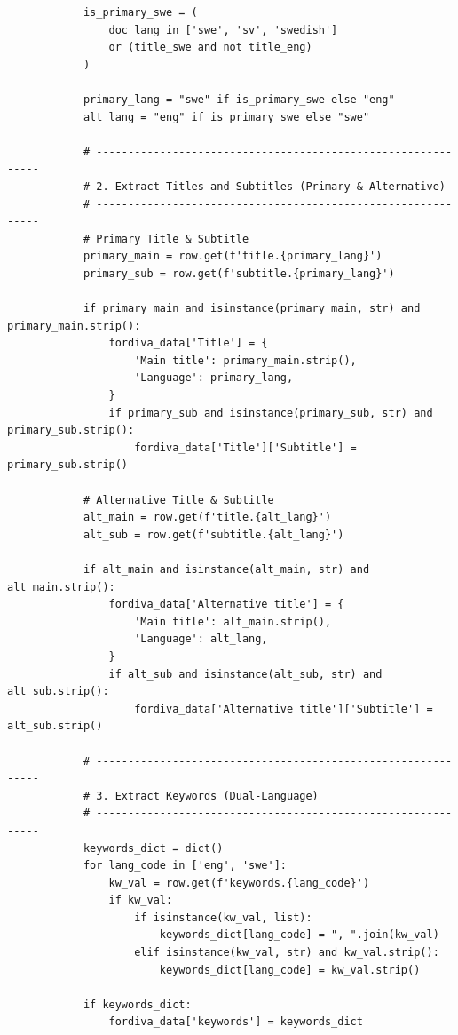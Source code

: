 \begin{lstlisting}
            is_primary_swe = (
                doc_lang in ['swe', 'sv', 'swedish']
                or (title_swe and not title_eng)
            )

            primary_lang = "swe" if is_primary_swe else "eng"
            alt_lang = "eng" if is_primary_swe else "swe"

            # -------------------------------------------------------------
            # 2. Extract Titles and Subtitles (Primary & Alternative)
            # -------------------------------------------------------------
            # Primary Title & Subtitle
            primary_main = row.get(f'title.{primary_lang}')
            primary_sub = row.get(f'subtitle.{primary_lang}')

            if primary_main and isinstance(primary_main, str) and primary_main.strip():
                fordiva_data['Title'] = {
                    'Main title': primary_main.strip(),
                    'Language': primary_lang,
                }
                if primary_sub and isinstance(primary_sub, str) and primary_sub.strip():
                    fordiva_data['Title']['Subtitle'] = primary_sub.strip()

            # Alternative Title & Subtitle
            alt_main = row.get(f'title.{alt_lang}')
            alt_sub = row.get(f'subtitle.{alt_lang}')

            if alt_main and isinstance(alt_main, str) and alt_main.strip():
                fordiva_data['Alternative title'] = {
                    'Main title': alt_main.strip(),
                    'Language': alt_lang,
                }
                if alt_sub and isinstance(alt_sub, str) and alt_sub.strip():
                    fordiva_data['Alternative title']['Subtitle'] = alt_sub.strip()

            # -------------------------------------------------------------
            # 3. Extract Keywords (Dual-Language)
            # -------------------------------------------------------------
            keywords_dict = dict()
            for lang_code in ['eng', 'swe']:
                kw_val = row.get(f'keywords.{lang_code}')
                if kw_val:
                    if isinstance(kw_val, list):
                        keywords_dict[lang_code] = ", ".join(kw_val)
                    elif isinstance(kw_val, str) and kw_val.strip():
                        keywords_dict[lang_code] = kw_val.strip()

            if keywords_dict:
                fordiva_data['keywords'] = keywords_dict


\end{lstlisting}
